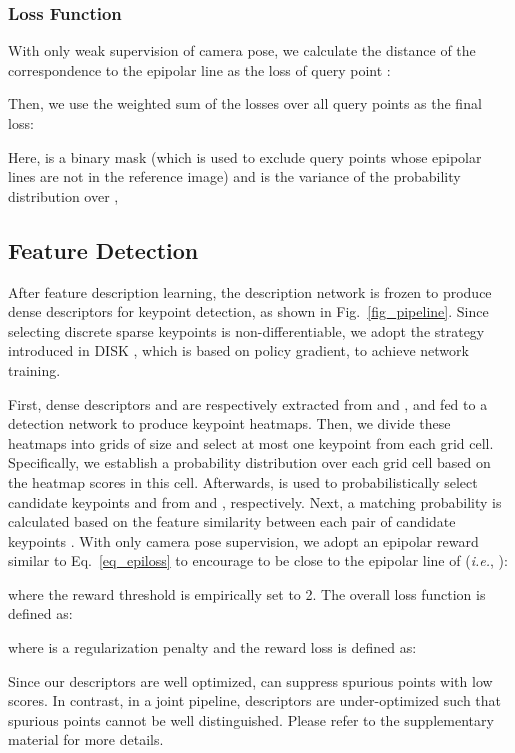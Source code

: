 \documentclass[10pt,twocolumn,letterpaper]{article}
\begin{document}
\subsubsection{Loss Function}
\label{sec_loss}
With only weak supervision of camera pose, we calculate the distance of the correspondence  to the epipolar line  as the loss of query point    \cite{wangLearningFeatureDescriptors2020}:

Then, we use the weighted sum of the losses over all query points as the final loss:

Here,  is a binary mask (which is used to exclude query points whose epipolar lines are not in the reference image) and   is the variance of the probability distribution over ,



\subsection{Feature Detection}
\label{text_method_dete}
After feature description learning, the description network is frozen to produce dense descriptors for keypoint detection, as shown in Fig.~\ref{fig_pipeline}. 
Since selecting discrete sparse keypoints is non-differentiable, we adopt the strategy introduced in DISK \cite{tyszkiewiczDISKLearningLocal2020a}, which is  based on policy gradient, to achieve network training.

First, dense descriptors  and  are respectively extracted from  and , and fed to a detection network to produce keypoint heatmaps. Then, we divide these heatmaps into grids of size  and select at most one keypoint from each grid cell. Specifically, we establish a probability distribution  over each grid cell based on the heatmap scores in this cell. Afterwards,  is used to probabilistically select candidate keypoints  and  from  and , respectively. Next, a matching probability  is calculated based on the feature similarity  between each pair of candidate keypoints . 
With only camera pose supervision, we adopt an epipolar reward similar to Eq.~\ref{eq_epiloss} to encourage  to be close to the epipolar line of  (\emph{i.e.}, ):

where the reward threshold  is empirically set to 2. The overall loss function is defined as: 

where  is a regularization penalty and the reward loss  is defined as:

Since our descriptors are well optimized,  can suppress spurious points with low scores. In contrast, in a joint pipeline,  descriptors are under-optimized such that spurious points cannot be well distinguished. Please refer to the supplementary material for more details.
\end{document}
